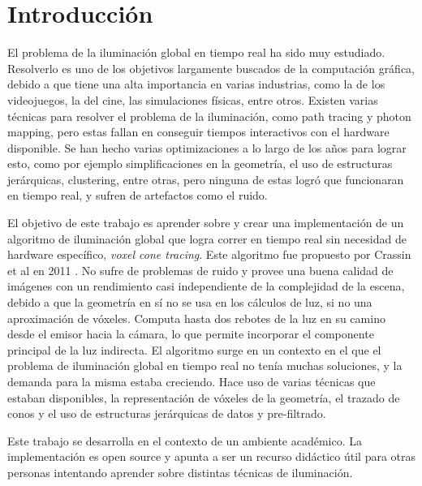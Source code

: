 \chapter{Introducción}


El problema de la iluminación global en tiempo real ha sido muy estudiado.
Resolverlo es uno de los objetivos largamente buscados de la computación gráfica, debido a que tiene una alta importancia en varias industrias, como la de los videojuegos, la del cine, las simulaciones físicas, entre otros.
Existen varias técnicas para resolver el problema de la iluminación, como path tracing y photon mapping, pero estas fallan en conseguir tiempos interactivos con el hardware disponible.
Se han hecho varias optimizaciones a lo largo de los años para lograr esto, como por ejemplo simplificaciones en la geometría, el uso de estructuras jerárquicas, clustering, entre otras, pero ninguna de estas logró que funcionaran en tiempo real, y sufren de artefactos como el ruido.

El objetivo de este trabajo es aprender sobre y crear una implementación de un algoritmo de iluminación global que logra correr en tiempo real sin necesidad de hardware específico, \textit{voxel cone tracing}.
Este algoritmo fue propuesto por Crassin et al en 2011 \cite{voxel-cone-tracing}.
No sufre de problemas de ruido y provee una buena calidad de imágenes con un rendimiento casi independiente de la complejidad de la escena, debido a que la geometría en sí no se usa en los cálculos de luz, si no una aproximación de vóxeles.
Computa hasta dos rebotes de la luz en su camino desde el emisor hacia la cámara, lo que permite incorporar el componente principal de la luz indirecta.
El algoritmo surge en un contexto en el que el problema de iluminación global en tiempo real no tenía muchas soluciones, y la demanda para la misma estaba creciendo.
Hace uso de varias técnicas que estaban disponibles, la representación de vóxeles de la geometría, el trazado de conos y el uso de estructuras jerárquicas de datos y pre-filtrado.

Este trabajo se desarrolla en el contexto de un ambiente académico.
La implementación es open source y apunta a ser un recurso didáctico útil para otras personas intentando aprender sobre distintas técnicas de iluminación.

